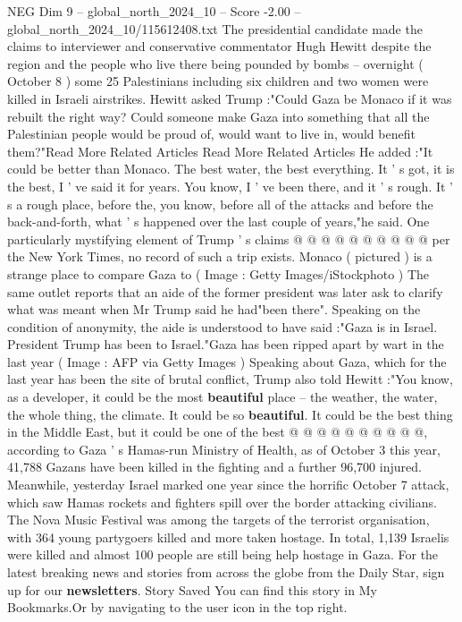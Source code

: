\begin{textsample}{NEG Dim 9 – global\_north\_2024\_10 – Score -2.00 – global\_north\_2024\_10/115612408.txt}  \label{ex:f9_neg_227}
The presidential candidate made the claims to interviewer and conservative commentator Hugh Hewitt despite the region and the people who live there being pounded by bombs -- overnight ( October 8 ) some 25 Palestinians including six children and two women were killed in Israeli airstrikes.
Hewitt asked Trump :"Could Gaza be Monaco if it was rebuilt the right way?
Could someone make Gaza into something that all the Palestinian people would be proud of, would want to live in, would benefit them?"Read More Related Articles Read More Related Articles He added :"It could be better than Monaco.
The best water, the best everything.
It ' s got, it is the best, I ' ve said it for years.
You know, I ' ve been there, and it ' s rough.
It ' s a rough place, before the, you know, before all of the attacks and before the back-and-forth, what ' s happened over the last couple of years,"he said.
One particularly mystifying element of Trump ' s claims @ @ @ @ @ @ @ @ @ @ per the New York Times, no record of such a trip exists.
Monaco ( pictured ) is a strange place to compare Gaza to ( Image : Getty Images/iStockphoto ) The same outlet reports that an aide of the former president was later ask to clarify what was meant when Mr Trump said he had"been there".
Speaking on the condition of anonymity, the aide is understood to have said :"Gaza is in Israel.
President Trump has been to Israel."Gaza has been ripped apart by wart in the last year ( Image : AFP via Getty Images ) Speaking about Gaza, which for the last year has been the site of brutal conflict, Trump also told Hewitt :"You know, as a developer, it could be the most \textbf{beautiful} place -- the weather, the water, the whole thing, the climate.
It could be so \textbf{beautiful}.
It could be the best thing in the Middle East, but it could be one of the best @ @ @ @ @ @ @ @ @ @, according to Gaza ' s Hamas-run Ministry of Health, as of October 3 this year, 41,788 Gazans have been killed in the fighting and a further 96,700 injured.
Meanwhile, yesterday Israel marked one year since the horrific October 7 attack, which saw Hamas rockets and fighters spill over the border attacking civilians.
The Nova Music Festival was among the targets of the terrorist organisation, with 364 young partygoers killed and more taken hostage.
In total, 1,139 Israelis were killed and almost 100 people are still being help hostage in Gaza.
For the latest breaking news and stories from across the globe from the Daily Star, sign up for our \textbf{newsletters}.
Story Saved You can find this story in My Bookmarks.Or by navigating to the user icon in the top right.

\end{textsample}
